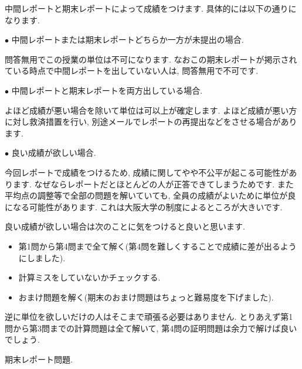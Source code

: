 \documentclass[dvipdfmx,a4paper,11pt]{article}
\theoremstyle{definition}
\begin{document}
中間レポートと期末レポートによって成績をつけます. 
具体的には以下の通りになります.
\vspace{11pt}

 \hspace{-11pt}$\bullet$ {\large 中間レポートまたは期末レポートどちらか一方が未提出の場合.}
 
問答無用でこの授業の単位は不可になります. なおこの期末レポートが掲示されている時点で中間レポートを出していない人は, 問答無用で不可です. 
\vspace{11pt}

 \hspace{-11pt}$\bullet$ {\large 中間レポートと期末レポートを両方出している場合.}
 
 よほど成績が悪い場合を除いて単位は可以上が確定します.  よほど成績が悪い方に対し救済措置を行い, 別途メールでレポートの再提出などをさせる場合があります.
 \vspace{11pt}
 
  \hspace{-11pt}$\bullet$ {\large 良い成績が欲しい場合.}
  
 今回レポートで成績をつけるため, 成績に関してやや不公平が起こる可能性があります. なぜならレポートだとほとんどの人が正答できてしまうためです.
 また平均点の調整等で全部の問題を解いていても, 全員の成績がよいために単位が良になる可能性があります. これは大阪大学の制度によるところが大きいです.
 
良い成績が欲しい場合は次のことに気をつけると良いと思います. 
 \begin{itemize}
 \setlength{\parskip}{0cm} %
  \setlength{\itemsep}{0cm}
 \item 第1問から第4問まで全て解く(第4問を難しくすることで成績に差が出るようにしました). 
 \item 計算ミスをしていないかチェックする.
 \item おまけ問題を解く(期末のおまけ問題はちょっと難易度を下げました).
 \end{itemize}

逆に単位を欲しいだけの人はそこまで頑張る必要はありません. とりあえず第1問から第3問までの計算問題は全て解いて, 第4問の証明問題は余力で解けば良いでしょう.  

\newpage
\begin{center}
{\LARGE 期末レポート問題.} 
\end{center}
\end{document}
